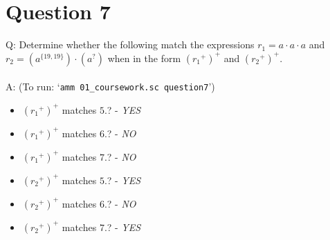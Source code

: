\documentclass[english]{scrartcl}
\begin{document}
\section*{Question 7}
Q: Determine whether the following match the expressions $ r_1 = a \cdot a \cdot a$ and
$ r_2 = (a^{\{19,19\}}) \cdot (a^?)$ when in the form $({r_1}^+)^+$ and $({r_2}^+)^+$.
\\
\\
A: (To run: `\verb|amm 01_coursework.sc question7|')
\begin{itemize}
    \item $({r_1}^+)^+$ matches $5.$? - \textit{YES}
    \item $({r_1}^+)^+$ matches $6.$? - \textit{NO}
    \item $({r_1}^+)^+$ matches $7.$? - \textit{NO}
    \item $({r_2}^+)^+$ matches $5.$? - \textit{YES}
    \item $({r_2}^+)^+$ matches $6.$? - \textit{NO}
    \item $({r_2}^+)^+$ matches $7.$? - \textit{YES}
\end{itemize}
\end{document}
